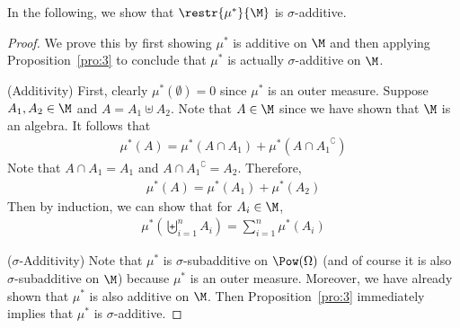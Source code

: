 \documentclass[thmcnt=section, 12pt]{elegantbook}
\begin{document}
\par In the following, we show that $ \restr{\mu^\ast}{\M} $ is $ \sigma $-additive.
\begin{proof}
    We prove this by first showing $ \mu^\ast $ is additive on $ \M $ and then applying Proposition~\ref{pro:3} to conclude that $ \mu^\ast $ is actually $ \sigma $-additive on $ \M $.

    \par (Additivity) First, clearly $ \mu^\ast(\emptyset) = 0 $ since $ \mu^\ast $ is an outer measure. Suppose $ A_1, A_2 \in \M $ and $ A = A_1 \uplus A_2 $. Note that $ A \in \M $ since we have shown that $ \M $ is an algebra. It follows that 
    \begin{align*}
        \mu^\ast(A) = \mu^\ast(A \cap A_1) + \mu^\ast(A \cap {A_1}^\complement)
    \end{align*}
    Note that $ A \cap A_1 = A_1 $ and $ A \cap {A_1}^\complement = A_2 $. Therefore,
    \begin{align*}
        \mu^\ast(A) = \mu^\ast(A_1) + \mu^\ast(A_2)
    \end{align*}
    Then by induction, we can show that for $ A_i \in \M $,
    \begin{align*}
        \mu^\ast\left(\biguplus_{i=1}^n {A_i}\right) = \sum_{i=1}^n {\mu^\ast(A_i)}
    \end{align*}

    \par ($ \sigma $-Additivity) Note that $ \mu^\ast $ is $ \sigma $-subadditive on $ \Pow(\Omega) $ (and of course it is also $ \sigma $-subadditive on $ \M $) because $ \mu^\ast $ is an outer measure. Moreover, we have already shown that $ \mu^\ast $ is also additive on $ \M $. Then Proposition~\ref{pro:3} immediately implies that $ \mu^\ast $ is $ \sigma $-additive.
\end{proof}
\end{document}
